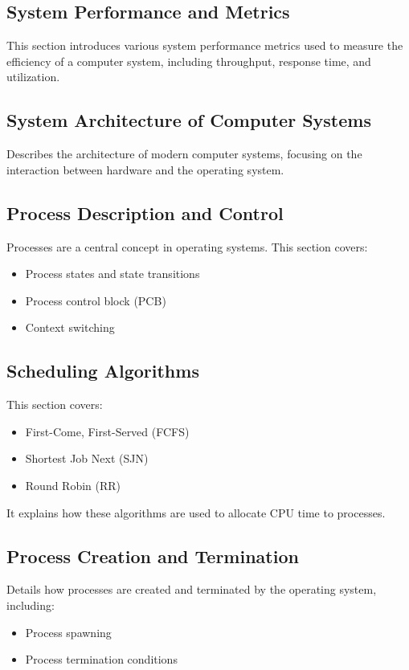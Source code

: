 \documentclass[12pt]{article}
\begin{document}
\subsection{System Performance and Metrics}
This section introduces various system performance metrics used to measure the efficiency of a computer system, including throughput, response time, and utilization.

\subsection{System Architecture of Computer Systems}
Describes the architecture of modern computer systems, focusing on the interaction between hardware and the operating system.

\subsection{Process Description and Control}
Processes are a central concept in operating systems. This section covers:
\begin{itemize}
    \item Process states and state transitions
    \item Process control block (PCB)
    \item Context switching
\end{itemize}

\subsection{Scheduling Algorithms}
This section covers:
\begin{itemize}
    \item First-Come, First-Served (FCFS)
    \item Shortest Job Next (SJN)
    \item Round Robin (RR)
\end{itemize}
It explains how these algorithms are used to allocate CPU time to processes.

\subsection{Process Creation and Termination}
Details how processes are created and terminated by the operating system, including:
\begin{itemize}
    \item Process spawning
    \item Process termination conditions
\end{itemize}
\end{document}
